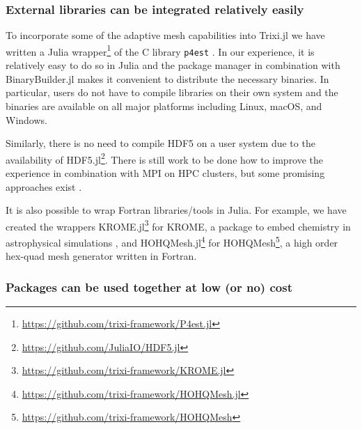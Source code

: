 \documentclass[hidelinks]{juliacon} %
\newcommand{\trixi}{Trixi.jl\xspace}
\begin{document}
\subsubsection{External libraries can be integrated relatively easily}

To incorporate some of the adaptive mesh capabilities into \trixi
we have written a Julia wrapper\footnote{\url{https://github.com/trixi-framework/P4est.jl}}
of the C library \texttt{p4est} \cite{burstedde2011p4est}. In our experience,
it is relatively easy to do so in Julia and the package manager in combination
with BinaryBuilder.jl makes it convenient to distribute the necessary binaries.
In particular, users do not have to compile libraries on their own system
and the binaries are available on all major platforms including Linux, macOS,
and Windows.

Similarly, there is no need to compile HDF5 on a user system due to the
availability of HDF5.jl\footnote{\url{https://github.com/JuliaIO/HDF5.jl}}.
There is still work to be done how to improve the experience in combination
with MPI on HPC clusters, but some promising
approaches exist \cite{byrne2021mpi}.

It is also possible to wrap Fortran libraries/tools in Julia. For example, we
have created the wrappers KROME.jl\footnote{\url{https://github.com/trixi-framework/KROME.jl}}
for KROME, a package to embed chemistry in astrophysical simulations
\cite{grassi2014krome}, and HOHQMesh.jl\footnote{\url{https://github.com/trixi-framework/HOHQMesh.jl}}
for HOHQMesh\footnote{\url{https://github.com/trixi-framework/HOHQMesh}}, a high order
hex-quad mesh generator written in Fortran.

\subsubsection{Packages can be used together at low (or no) cost}
\end{document}
